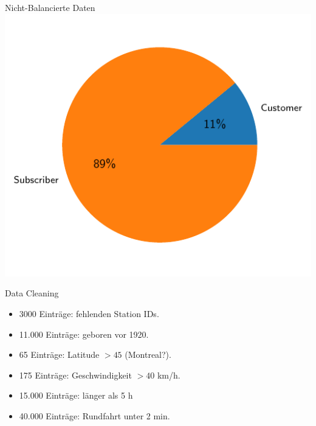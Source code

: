 \begin{frame}{Nicht-Balancierte Daten}
\centering
\includegraphics[height=0.9\textheight]{../Images/Piechart}
\end{frame}

\begin{frame}{Data Cleaning}
\centering
{}
{
\begin{itemize}
\item 3000 Einträge: fehlenden Station IDs.
\item 11.000 Einträge: geboren vor 1920.
\item 65 Einträge: Latitude $ > 45$ (Montreal?).
\item 175 Einträge: Geschwindigkeit $ > 40$ km/h.
\item 15.000 Einträge: länger als 5 h
\item 40.000 Einträge: Rundfahrt unter 2 min.
\end{itemize}
}
\end{frame}

